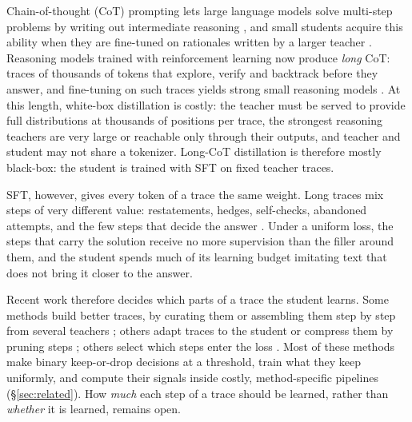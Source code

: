 \documentclass[11pt]{article}
\begin{document}
Chain-of-thought (CoT) prompting lets large language models solve multi-step problems by writing out intermediate reasoning \citep{wei2022cot}, and small students acquire this ability when they are fine-tuned on rationales written by a larger teacher \citep{ho2023teachers,magister2023teaching}.
Reasoning models trained with reinforcement learning now produce \emph{long} CoT: traces of thousands of tokens that explore, verify and backtrack before they answer, and fine-tuning on such traces yields strong small reasoning models \citep{deepseek2025r1,muennighoff2025s1,ye2025limo}.
At this length, white-box distillation is costly: the teacher must be served to provide full distributions at thousands of positions per trace, the strongest reasoning teachers are very large or reachable only through their outputs, and teacher and student may not share a tokenizer.
Long-CoT distillation is therefore mostly black-box: the student is trained with SFT on fixed teacher traces.

SFT, however, gives every token of a trace the same weight.
Long traces mix steps of very different value: restatements, hedges, self-checks, abandoned attempts, and the few steps that decide the answer \citep{bogdan2025thoughtanchors}.
Under a uniform loss, the steps that carry the solution receive no more supervision than the filler around them, and the student spends much of its learning budget imitating text that does not bring it closer to the answer.

Recent work therefore decides which parts of a trace the student learns.
Some methods build better traces, by curating them \citep{muennighoff2025s1,ye2025limo} or assembling them step by step from several teachers \citep{yun2026cord}; others adapt traces to the student \citep{liu2026palign} or compress them by pruning steps \citep{li2026stepentropy,cui2025spirit}; others select which steps enter the loss \citep{fan2026sgl,wang2026segattr}.
Most of these methods make binary keep-or-drop decisions at a threshold, train what they keep uniformly, and compute their signals inside costly, method-specific pipelines (\S\ref{sec:related}).
How \emph{much} each step of a trace should be learned, rather than \emph{whether} it is learned, remains open.
\end{document}
